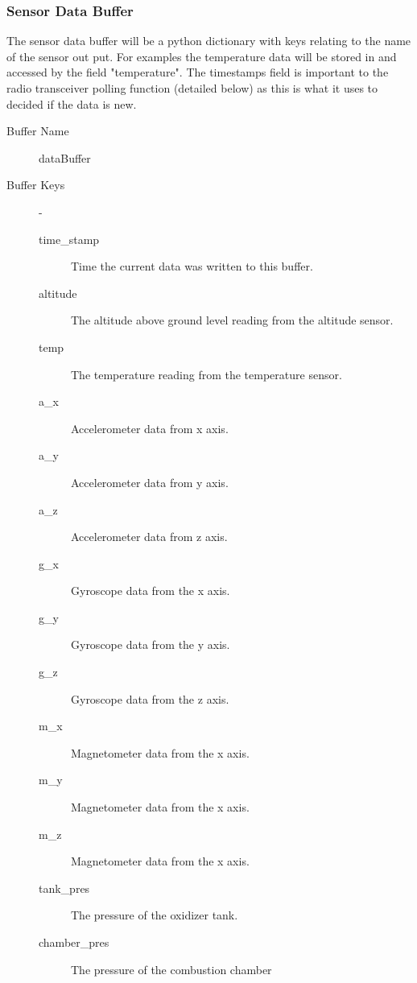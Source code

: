 \documentclass[10pt,draftclsnofoot,onecolumn,compsoc]{IEEEtran}
\begin{document}
\subsubsection{Sensor Data Buffer}
The sensor data buffer will be a python dictionary with keys relating to the name of the sensor out put. For examples the temperature data will be stored in and accessed by the field "temperature".  The timestamps field is important to the radio transceiver polling function (detailed below) as this is what it uses to decided if the data is new.
\begin{description}
	\item[Buffer Name] dataBuffer
	\item[Buffer Keys]  -
		\begin{description}
			\item[time\_stamp] Time the current data was written to this buffer.
			\item[altitude] The altitude above ground level reading from the altitude sensor.
			\item[temp] The temperature reading from the temperature sensor.
			\item[a\_x] Accelerometer data from x axis.
			\item[a\_y] Accelerometer data from y axis.
			\item[a\_z] Accelerometer data from z axis.
			\item[g\_x] Gyroscope data from the x axis.
			\item[g\_y] Gyroscope data from the y axis.
			\item[g\_z] Gyroscope data from the z axis.
			\item[m\_x] Magnetometer data from the x axis.
			\item[m\_y] Magnetometer data from the x axis.
			\item[m\_z] Magnetometer data from the x axis.
			\item[tank\_pres] The pressure of the oxidizer tank.
			\item[chamber\_pres] The pressure of the combustion chamber
		\end{description}
\end{description}
\end{document}
